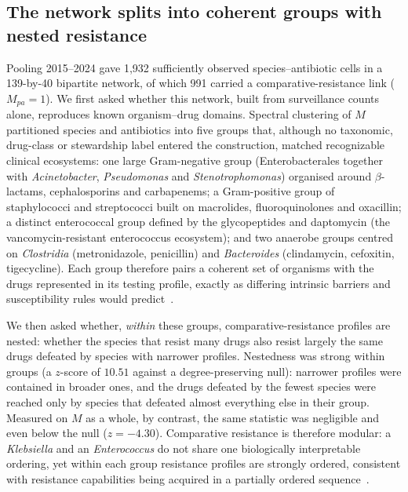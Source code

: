\documentclass[10pt]{article}
\begin{document}
\subsection*{The network splits into coherent groups with nested resistance}
Pooling 2015--2024 gave 1{,}932 sufficiently observed species--antibiotic cells in a 139-by-40 bipartite network, of which 991 carried a comparative-resistance link (\(M_{pa}=1\)). We first asked whether this network, built from surveillance counts alone, reproduces known organism--drug domains. Spectral clustering of \(M\) partitioned species and antibiotics into five groups that, although no taxonomic, drug-class or stewardship label entered the construction, matched recognizable clinical ecosystems: one large Gram-negative group (Enterobacterales together with \emph{Acinetobacter}, \emph{Pseudomonas} and \emph{Stenotrophomonas}) organised around \(\beta\)-lactams, cephalosporins and carbapenems; a Gram-positive group of staphylococci and streptococci built on macrolides, fluoroquinolones and oxacillin; a distinct enterococcal group defined by the glycopeptides and daptomycin (the vancomycin-resistant enterococcus ecosystem); and two anaerobe groups centred on \emph{Clostridia} (metronidazole, penicillin) and \emph{Bacteroides} (clindamycin, cefoxitin, tigecycline). Each group therefore pairs a coherent set of organisms with the drugs represented in its testing profile, exactly as differing intrinsic barriers and susceptibility rules would predict~\cite{nikaido2003,leclercq2013}.

We then asked whether, \emph{within} these groups, comparative-resistance profiles are nested: whether the species that resist many drugs also resist largely the same drugs defeated by species with narrower profiles. Nestedness was strong within groups (a \(z\)-score of \(10.51\) against a degree-preserving null): narrower profiles were contained in broader ones, and the drugs defeated by the fewest species were reached only by species that defeated almost everything else in their group. Measured on \(M\) as a whole, by contrast, the same statistic was negligible and even below the null (\(z=-4.30\)). Comparative resistance is therefore modular: a \emph{Klebsiella} and an \emph{Enterococcus} do not share one biologically interpretable ordering, yet within each group resistance profiles are strongly ordered, consistent with resistance capabilities being acquired in a partially ordered sequence~\cite{toprak2012,barbosa2017}.
\end{document}
